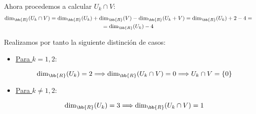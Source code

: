 \documentclass[12pt]{article}
\begin{document}
\begin{ejercicio}
\begin{enumerate}
        Ahora procedemos a calcular $U_k\cap V$:
        \begin{multline*}
            \dim_{\bb{R}}(U_k\cap V) = \dim_{\bb{R}}(U_k) + \dim_{\bb{R}}(V) - \dim_{\bb{R}}(U_k+V) = \dim_{\bb{R}}(U_k)+2-4 =\\= \dim_{\bb{R}}(U_k)-4
        \end{multline*}

        Realizamos por tanto la siguiente distinción de casos:
        \begin{itemize}
            \item \underline{Para $k=1,2$}:

            \begin{equation*}
                \dim_{\bb{R}}(U_k)=2 \Longrightarrow
                \dim_{\bb{R}}(U_k\cap V)=0 \Longrightarrow U_k\cap V =\{0\}
            \end{equation*}

            \item \underline{Para $k\neq 1,2$}:

            \begin{equation*}
                \dim_{\bb{R}}(U_k)=3 \Longrightarrow
                \dim_{\bb{R}}(U_k\cap V)=1
            \end{equation*}


\end{itemize}
\end{enumerate}
\end{ejercicio}
\end{document}
